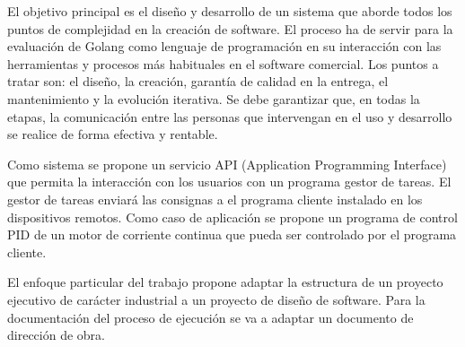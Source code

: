 
El objetivo principal es el diseño y desarrollo de un sistema que aborde todos los puntos de complejidad en la creación de software.
El proceso ha de servir para la evaluación de Golang como lenguaje de programación en su interacción con las herramientas y procesos más habituales en el software comercial.
Los puntos a tratar son: el diseño, la creación, garantía de calidad en la entrega, el mantenimiento y la evolución iterativa.
Se debe garantizar que, en todas la etapas, la comunicación entre las personas que intervengan en el uso y desarrollo se realice de forma efectiva y rentable.

Como sistema se propone un servicio \gls{API} (Application Programming Interface) que permita la interacción con los usuarios con un programa gestor de tareas.
El gestor de tareas enviará las consignas a el programa cliente instalado en los dispositivos remotos.
Como caso de aplicación se propone un programa de control PID de un motor de corriente continua que pueda ser controlado por el programa cliente.

El enfoque particular del trabajo propone adaptar la estructura de un proyecto ejecutivo de carácter industrial a un proyecto de diseño de software.
Para la documentación del proceso de ejecución se va a adaptar un documento de dirección de obra.

